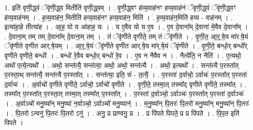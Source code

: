 \documentclass[17pt]{extarticle}
\begin{document}
1. इति॑ वृणी॒द्ध्वं ॅवृ॑णी॒द्ध्व मितीति॑ वृणी॒द्ध्वम् । . वृ॒णी॒द्ध्वꣳ ह॑व्य॒वाह॑नꣳ हव्य॒वाह॑नं ॅवृणी॒द्ध्वं ॅवृ॑णी॒द्ध्वꣳ ह॑व्य॒वाह॑नम् । . ह॒व्य॒वाह॑न॒ मितीति॑ हव्य॒वाह॑नꣳ हव्य॒वाह॑न॒ मिति॑ । . ह॒व्य॒वाह॑न॒मिति॑ हव्य - वाह॑नम् । . इत्या॑हा॒हे तीत्या॑ह । . आ॒ह॒ यो य आ॑हाह॒ यः । . य ए॒वैव यो य ए॒व । . ए॒व दे॒वाना᳚म् दे॒वाना॑ मे॒वैव दे॒वाना᳚म् । . दे॒वाना॒म् तम् तम् दे॒वाना᳚म् दे॒वाना॒म् तम् । . तं ॅवृ॑णीते वृणीते॒ तम् तं ॅवृ॑णीते । . वृ॒णी॒त॒ आ॒र्॒.षे॒य मा॑र.षे॒यं ॅवृ॑णीते वृणीत आर्.षे॒यम् । . आ॒र्॒.षे॒यं ॅवृ॑णीते वृणीत आर्.षे॒य मा॑र्.षे॒यं ॅवृ॑णीते । . वृ॒णी॒ते॒ बन्धो॒र् बन्धो᳚र् वृणीते वृणीते॒ बन्धोः᳚ । . बन्धो॑ रे॒वैव बन्धो॒र् बन्धो॑ रे॒व । . ए॒व न नैवैव न । . नैत्ये॑ति॒ न नैति॑ । . ए॒त्यथो॒ अथो॑ एत्ये॒त्यथो᳚ । . अथो॒ सन्त॑त्यै॒ सन्त॑त्या॒ अथो॒ अथो॒ सन्त॑त्यै । . अथो॒ इत्यथो᳚ । . सन्त॑त्यै प॒रस्ता᳚त् प॒रस्ता॒थ् सन्त॑त्यै॒ सन्त॑त्यै प॒रस्ता᳚त् । . सन्त॑त्या॒ इति॒ सं - त॒त्यै॒ । . प॒रस्ता॑ द॒र्वाचो॒ ऽर्वाचः॑ प॒रस्ता᳚त् प॒रस्ता॑ द॒र्वाचः॑ । . अ॒र्वाचो॑ वृणीते वृणीते॒ ऽर्वाचो॒ ऽर्वाचो॑ वृणीते । . वृ॒णी॒ते॒ तस्मा॒त् तस्मा᳚द् वृणीते वृणीते॒ तस्मा᳚त् । . तस्मा᳚त् प॒रस्ता᳚त् प॒रस्ता॒त् तस्मा॒त् तस्मा᳚त् प॒रस्ता᳚त् । . प॒रस्ता॑ द॒र्वाञ्चो॒ ऽर्वाञ्चः॑ प॒रस्ता᳚त् प॒रस्ता॑ द॒र्वाञ्चः॑ । . अ॒र्वाञ्चो॑ मनु॒ष्या᳚न् मनु॒ष्या॑ न॒र्वाञ्चो॒ ऽर्वाञ्चो॑ मनु॒ष्यान्॑ । . म॒नु॒ष्या᳚न् पि॒तरः॑ पि॒तरो॑ मनु॒ष्या᳚न् मनु॒ष्या᳚न् पि॒तरः॑ । . पि॒तरो ऽन्वनु॑ पि॒तरः॑ पि॒तरो ऽनु॑ । . अनु॒ प्र प्राण्वनु॒ प्र । . प्र पि॑पते पिपते॒ प्र प्र पि॑पते । . पि॒प॒त इति॑ पिपते । \newline
\end{document}
